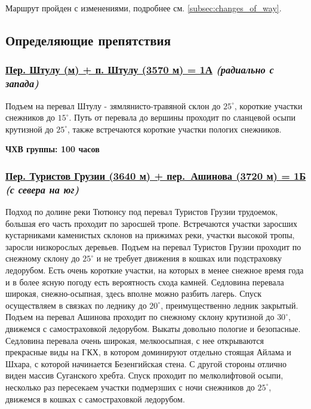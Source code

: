 		Маршрут пройден с изменениями, подробнее см. \ref{subsec:changes_of_way}.

	
	\subsection{Определяющие препятствия}\label{subsec:main_obstacles}	
		\subsubsection*{%
			\hyperref[subsec:Day2]{Пер. Штулу (м) + п. Штулу (3570 м) = 1А}
			{\it (радиально с запада)}%
		}
			Подъем на перевал Штулу - зямлянисто-травяной склон до $25^\circ$, короткие участки снежников
			до $15^\circ$. Путь от перевала до вершины проходит по сланцевой осыпи крутизной до $25^\circ$,
			также встречаются короткие участки пологих снежников.

			{\bf ЧХВ группы: 100 часов}
		
		\subsubsection*{%
			\hyperref[subsec:Day4]{Пер. Туристов Грузии (3640 м) + пер.~Ашинова (3720 м) = 1Б}
			{\it (с севера на юг)}%
		}
			Подход по долине реки Тютюнсу под перевал Туристов Грузии трудоемок, большая его часть проходит по
			заросшей тропе. Встречаются участки заросших кустарниками каменистых склонов на прижимах реки,
			участки высокой тропы, заросли низкорослых деревьев. Подъем на перевал Туристов Грузии проходит по
			снежному склону до $25^\circ$ и не требует движения в кошках или подстраховку ледорубом. Есть очень
			короткие участки, на которых в менее снежное время года и в более ясную погоду есть вероятность
			схода камней. Седловина перевала широкая, снежно-осыпная, здесь вполне можно разбить лагерь. Спуск
			осуществляем в связках по леднику до $20^\circ$, преимущественно ледник закрытый. Подъем на перевал
			Ашинова проходит по снежному склону крутизной до $30^\circ$, движемся с самостраховкой ледорубом.
			Выкаты довольно пологие и безопасные. Седловина перевала очень широкая, мелкоосыпная, с нее
			открываются прекрасные виды на ГКХ, в котором доминируют отдельно стоящая Айлама и Шхара, с которой
			начинается Безенгийская стена. С другой стороны отлично виден массив Суганского хребта. Спуск
			проходит по мелколифтовой осыпи, несколько раз пересекаем участки подмерзших с ночи снежников
			до $25^\circ$, движемся в кошках с самостраховкой ледорубом.
		
